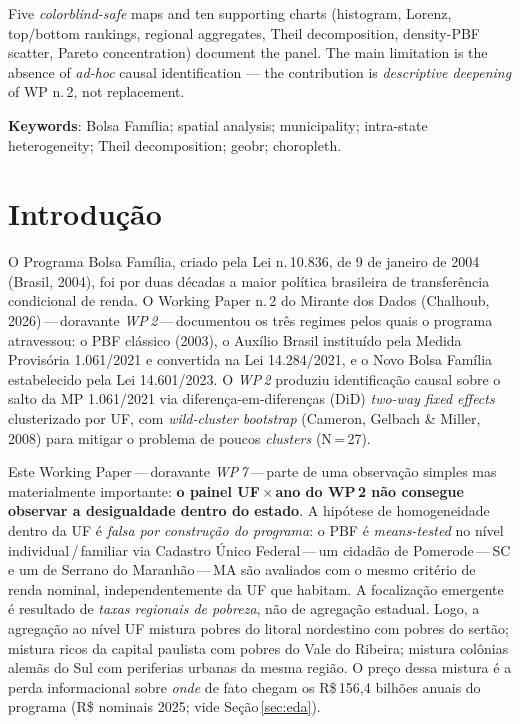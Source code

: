 \documentclass[12pt,a4paper,oneside]{article}
\newcommand{\rs}{R\$\,}
\begin{document}
Five \textit{colorblind-safe} maps and ten supporting charts (histogram,
Lorenz, top/bottom rankings, regional aggregates, Theil decomposition,
density-PBF scatter, Pareto concentration) document the panel. The main
limitation is the absence of \textit{ad-hoc} causal identification — the
contribution is \textit{descriptive deepening} of WP n.\,2, not replacement.

\smallskip
\noindent\textbf{Keywords}: Bolsa Família; spatial analysis; municipality;
intra-state heterogeneity; Theil decomposition; geobr; choropleth.

\clearpage

\section{Introdução}\label{sec:intro}

O Programa Bolsa Família, criado pela Lei n.\,10.836, de 9 de janeiro de
2004 (Brasil, 2004), foi por duas décadas a maior política brasileira de
transferência condicional de renda. O Working Paper n.\,2 do Mirante dos
Dados (Chalhoub, 2026)\,---\,doravante \textit{WP\,2}\,---\,documentou os
três regimes pelos quais o programa atravessou: o PBF clássico
(2003), o Auxílio Brasil instituído pela Medida Provisória
1.061/2021 e convertida na Lei 14.284/2021, e o Novo Bolsa Família
estabelecido pela Lei 14.601/2023. O \textit{WP\,2} produziu identificação
causal sobre o salto da MP 1.061/2021 via diferença-em-diferenças (DiD)
\textit{two-way fixed effects} clusterizado por UF, com \textit{wild-cluster
bootstrap} (Cameron, Gelbach \& Miller, 2008) para mitigar o problema de
poucos \textit{clusters} (N\,=\,27).

Este Working Paper\,---\,doravante \textit{WP\,7}\,---\,parte de uma observação
simples mas materialmente importante: \textbf{o painel UF\,$\times$\,ano do WP\,2
não consegue observar a desigualdade dentro do estado}. A hipótese de
homogeneidade dentro da UF é \textit{falsa por construção do programa}: o
PBF é \textit{means-tested} no nível individual\,/\,familiar via Cadastro
Único Federal\,---\,um cidadão de Pomerode\,---\,SC e um de Serrano do
Maranhão\,---\,MA são avaliados com o mesmo critério de renda nominal,
independentemente da UF que habitam. A focalização emergente é resultado
de \textit{taxas regionais de pobreza}, não de agregação estadual. Logo, a
agregação ao nível UF mistura pobres do litoral nordestino com pobres do
sertão; mistura ricos da capital paulista com pobres do Vale do Ribeira;
mistura colônias alemãs do Sul com periferias urbanas da mesma região. O
preço dessa mistura é a perda informacional sobre \textit{onde} de fato
chegam os \rs 156{,}4 bilhões anuais do programa (R\$ nominais 2025; vide
Seção\,\ref{sec:eda}).
\end{document}
